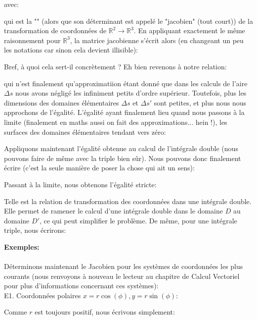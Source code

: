 	avec:
	
	qui est la "" (alors que son déterminant est appelé le "jacobien" (tout court)) de la transformation de coordonnées de $\mathbb{R}^2 \rightarrow \mathbb{R}^3$. En appliquant exactement le même raisonnement pour $\mathbb{R}^3$, la matrice jacobienne s'écrit alors (en changeant un peu les notations car sinon cela devient illisible):
	
	Bref, à quoi cela sert-il concrètement ? Eh bien revenons à notre relation:
	
	qui n'est finalement qu'approximatiion étant donné que dans les calculs de l'aire $\Delta s$ nous avons négligé les infiniment petits d'ordre supérieur. Toutefois, plus les dimensions des domaines élémentaires $\Delta s$ et $\Delta s'$ sont petites, et plus nous nous approchons de l'égalité. L'égalité ayant finalement lieu quand nous passons à la limite (finalement en maths aussi on fait des approximations... hein !), les surfaces des domaines élémentaires tendant vers zéro:
	
	Appliquons maintenant l'égalité obtenue au calcul de l'intégrale double (nous pouvons faire de même avec la triple bien sûr). Nous pouvons donc finalement écrire (c'est la seule manière de poser la chose qui ait un sens):
	
	Passant à la limite, nous obtenons l'égalité stricte:
	
	Telle est la relation de transformation des coordonnées dans une intégrale double. Elle permet de ramener le calcul d'une intégrale double dans le domaine $D$ au domaine $D'$, ce qui peut simplifier le problème. De même, pour une intégrale triple, nous écrirons:
	
	
	\begin{tcolorbox}[colframe=black,colback=white,sharp corners]
	\textbf{{\Large {}}Exemples:}\\\\
	Déterminons maintenant le Jacobien pour les systèmes de coordonnées les plus courants (nous renvoyons à nouveau le lecteur au chapitre de Calcul Vectoriel pour plus d'informations concernant ces systèmes):\\
	
	E1. Coordonnées polaires\label{jacobian in polar coordinates} $x=r\cos(\phi),y=r\sin(\phi)$:
	
	Comme $r$ est toujours positif, nous écrivons simplement:
	
	\end{tcolorbox}
	
